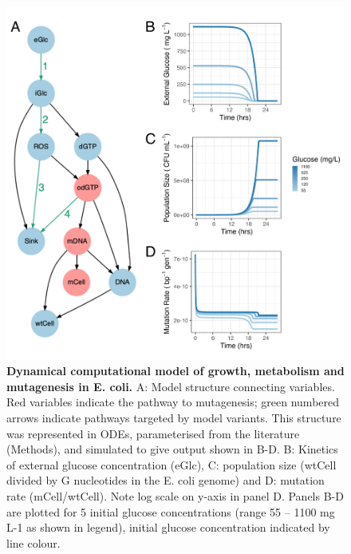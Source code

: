 \documentclass[
  12pt,
  letterpaper,
  DIV=11,
  numbers=noendperiod]{scrreprt}
\begin{document}
\begin{figure}

{\centering \includegraphics{Fig1jpg.jpg}

}

\caption{\label{fig-1}\textbf{Dynamical computational model of growth,
metabolism and mutagenesis in E. coli.} A: Model structure connecting
variables. Red variables indicate the pathway to mutagenesis; green
numbered arrows indicate pathways targeted by model variants. This
structure was represented in ODEs, parameterised from the literature
(Methods), and simulated to give output shown in B-D. B: Kinetics of
external glucose concentration (eGlc), C: population size (wtCell
divided by G nucleotides in the E. coli genome) and D: mutation rate
(mCell/wtCell). Note log scale on y-axis in panel D. Panels B-D are
plotted for 5 initial glucose concentrations (range 55 -- 1100 mg L-1 as
shown in legend), initial glucose concentration indicated by line
colour.}

\end{figure}

\begin{table}

\end{table}

\end{document}

